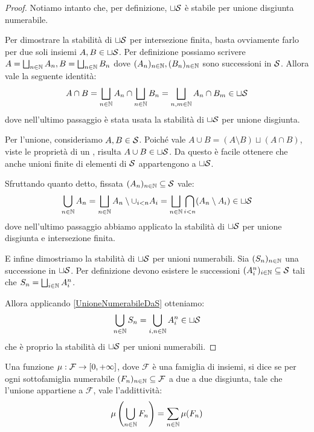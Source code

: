\begin{proof}
	Notiamo intanto che, per definizione, $\sqcup\S$ è stabile per unione disgiunta numerabile.
	
	Per dimostrare la stabilità di $\sqcup\S$ per intersezione finita, basta ovviamente farlo per due soli insiemi $A,B\in\sqcup\S$. Per definizione possiamo scrivere $A=\bigsqcup_{n\in\N} A_n, B=\bigsqcup_{n\in\N} B_n$ dove $(A_n)_{n\in\N},(B_n)_{n\in\N}$ sono successioni in $\S$. Allora vale la seguente identità:
	\begin{equation*}
		A\cap B=\bigsqcup_{n\in\N} A_n\cap\bigsqcup_{n\in\N} B_n=
		\bigsqcup_{n,m\in\N} A_n\cap B_m\in\sqcup\S
	\end{equation*}
	dove nell'ultimo passaggio è stata usata la stabilità di $\sqcup\S$ per unione disgiunta.
	
	Per l'unione, consideriamo $A,B\in\S$. Poiché vale $A\cup B=(A\setminus B)\sqcup(A\cap B)$, viste le proprietà di un \semiring{}, risulta $A\cup B\in \sqcup\S$. Da questo è facile ottenere che anche unioni finite di elementi di $\S$ appartengono a $\sqcup\S$.
	
	Sfruttando quanto detto, fissata $(A_n)_{n\in\N}\subseteq\S$ vale:
	\begin{equation}\label{UnioneNumerabileDaS}
		\bigcup_{n\in\N} A_n=\bigsqcup_{n\in\N} A_n\setminus\cup_{i<n} A_i
		=\bigsqcup_{n\in\N} \bigcap_{i<n} (A_n\setminus A_i)\in\sqcup\S
	\end{equation}
	dove nell'ultimo passaggio abbiamo applicato la stabilità di $\sqcup\S$ per unione disgiunta e intersezione finita.
	
	E infine dimostriamo la stabilità di $\sqcup\S$ per unioni numerabili. Sia $(S_n)_{n\in\N}$ una successione in $\sqcup\S$. Per definizione devono esistere le successioni $(A^n_i)_{i\in\N}\subseteq \S$ tali che $S_n=\bigsqcup_{i\in\N} A^n_i$.
	
	Allora applicando \cref{UnioneNumerabileDaS} otteniamo:
	\begin{equation*}
		\bigcup_{n\in\N}S_n=\bigcup_{i,n\in\N}A^n_i\in\sqcup\S 
	\end{equation*}
	che è proprio la stabilità di $\sqcup\S$ per unioni numerabili.
\end{proof}

\begin{definition}[{\sigadd[ità]}]
	Una funzione $\mu:\mathcal F\to \Rpiu$, dove $\mathcal F$ è una famiglia di insiemi, si dice \sigadd{} se per ogni sottofamiglia numerabile $(F_n)_{n\in\N}\subseteq \mathcal F$ a due a due disgiunta, tale che l'unione appartiene a $\mathcal F$, vale l'addittività:
	\begin{equation*}
		\mu\left(\bigcup_{n\in\N}F_n \right)=\sum_{n\in\N} \mu(F_n) 
	\end{equation*}
\end{definition}

